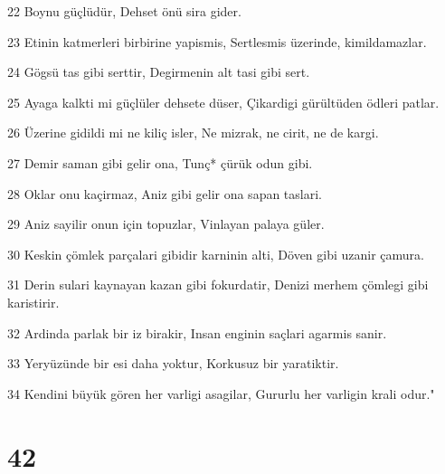 \par 22 Boynu güçlüdür, Dehset önü sira gider.
\par 23 Etinin katmerleri birbirine yapismis, Sertlesmis üzerinde, kimildamazlar.
\par 24 Gögsü tas gibi serttir, Degirmenin alt tasi gibi sert.
\par 25 Ayaga kalkti mi güçlüler dehsete düser, Çikardigi gürültüden ödleri patlar.
\par 26 Üzerine gidildi mi ne kiliç isler, Ne mizrak, ne cirit, ne de kargi.
\par 27 Demir saman gibi gelir ona, Tunç* çürük odun gibi.
\par 28 Oklar onu kaçirmaz, Aniz gibi gelir ona sapan taslari.
\par 29 Aniz sayilir onun için topuzlar, Vinlayan palaya güler.
\par 30 Keskin çömlek parçalari gibidir karninin alti, Döven gibi uzanir çamura.
\par 31 Derin sulari kaynayan kazan gibi fokurdatir, Denizi merhem çömlegi gibi karistirir.
\par 32 Ardinda parlak bir iz birakir, Insan enginin saçlari agarmis sanir.
\par 33 Yeryüzünde bir esi daha yoktur, Korkusuz bir yaratiktir.
\par 34 Kendini büyük gören her varligi asagilar, Gururlu her varligin krali odur."

\chapter{42}

